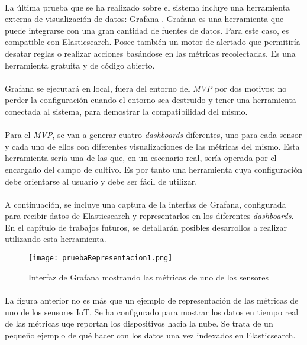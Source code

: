 \documentclass[../../memoria.tex]{subfiles}
\begin{document}
\paragraph{}
La última prueba que se ha realizado sobre el sistema incluye una herramienta externa de visualización de datos: Grafana \cite{grafana}. Grafana es una herramienta que puede integrarse con una gran cantidad de fuentes de datos. Para este caso, es compatible con Elasticsearch. Posee también un motor de alertado que permitiría desatar reglas o realizar acciones basándose en las métricas recolectadas. Es una herramienta gratuita y de código abierto.

\paragraph{}
Grafana se ejecutará en local, fuera del entorno del \textit{MVP} por dos motivos: no perder la configuración cuando el entorno sea destruido y tener una herramienta conectada al sistema, para demostrar la compatibilidad del mismo.

\paragraph{}
Para el \textit{MVP}, se van a generar cuatro \textit{dashboards} diferentes, uno para cada sensor y cada uno de ellos con diferentes visualizaciones de las métricas del mismo. Esta herramienta sería una de las que, en un escenario real, sería operada por el encargado del campo de cultivo. Es por tanto una herramienta cuya configuración debe orientarse al usuario y debe ser fácil de utilizar.

\paragraph{}
A continuación, se incluye una captura de la interfaz de Grafana, configurada para recibir datos de Elasticsearch y representarlos en los diferentes \textit{dashboards}. En el capítulo de trabajos futuros, se detallarán posibles desarrollos a realizar utilizando esta herramienta.

\begin{figure}[H]
    \centering
    \texttt{[image: pruebaRepresentacion1.png]}
    \caption{Interfaz de Grafana mostrando las métricas de uno de los sensores}
    \label{fig:pruebaRepresentacion1}
\end{figure}

\paragraph{}
La figura anterior no es más que un ejemplo de representación de las métricas de uno de los sensores IoT. Se ha configurado para mostrar los datos en tiempo real de las métricas uqe reportan los dispositivos hacia la nube. Se trata de un pequeño ejemplo de qué hacer con los datos una vez indexados en Elasticsearch.
\end{document}
